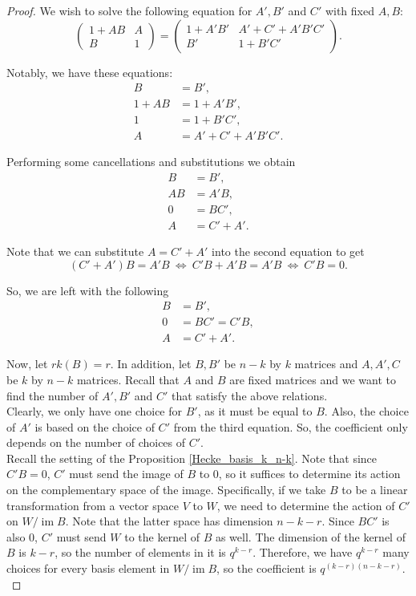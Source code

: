 \documentclass[12pt,reqno]{amsart}
\theoremstyle{definition}
\theoremstyle{remark}
\numberwithin{equation}{section}
\DeclareMathOperator{\im}{im}
\begin{document}
\begin{proof}
We wish to solve the following equation for $A',B'$ and $C'$ with fixed $A,B$:
\[
    \begin{pmatrix}
1+AB & A \\
B & 1 
\end{pmatrix} = \begin{pmatrix}
1+A'B' & A'+C'+A'B'C' \\
B' & 1+B'C'
\end{pmatrix}.
\]


Notably, we have these equations:
\begin{align*}
    B &= B',\\
    1+AB &= 1+A'B',\\
    1 &= 1 + B'C',\\
    A &= A'+C' + A'B'C'.
\end{align*}

Performing some cancellations and substitutions we obtain
\begin{align*}
    B &= B',\\
    AB &= A'B,\\
    0 &= BC',\\
    A &= C' + A'.
\end{align*}

Note that we can substitute $A = C'+A'$ into the second equation to get 
\[
    (C'+A')B = A'B \ \Leftrightarrow \
    C'B + A'B = A'B \ \Leftrightarrow \
    C'B = 0.
\]

So, we are left with the following
\begin{align*}
    B &= B',\\
    0 &= BC' = C'B,\\
    A &= C' + A'.
\end{align*}

Now, let $rk(B) = r$. In addition, let $B, B'$ be $n-k$ by $k$ matrices and $A, A', C$ be $k$ by $n-k$ matrices. Recall that $A$ and $B$ are fixed matrices and we want to find the number of $A', B'$ and $C'$ that satisfy the above relations.\\

Clearly, we only have one choice for $B'$, as it must be equal to $B$. Also, the choice of $A'$ is based on the choice of $C'$ from the third equation. So, the coefficient only depends on the number of choices of $C'$.\\

Recall the setting of the Proposition \ref{Hecke_basis_k_n-k}. Note that since $C'B = 0$, $C'$ must send the image of $B$ to $0$, so it suffices to determine its action on the complementary space of the image. Specifically, if we take $B$ to be a linear transformation from a vector space $V$ to $W$, we need to determine the action of $C'$ on $W / \im B$. Note that the latter space has dimension $n-k-r$. Since $BC'$ is also $0$, $C'$ must send $W$ to the kernel of $B$ as well. The dimension of the kernel of $B$ is $k-r$, so the number of elements in it is $q^{k-r}$. Therefore, we have $q^{k-r}$ many choices for every basis element in $W / \im B$, so the coefficient is $q^{(k-r)(n-k-r)}$.\\
\end{proof}
\end{document}
